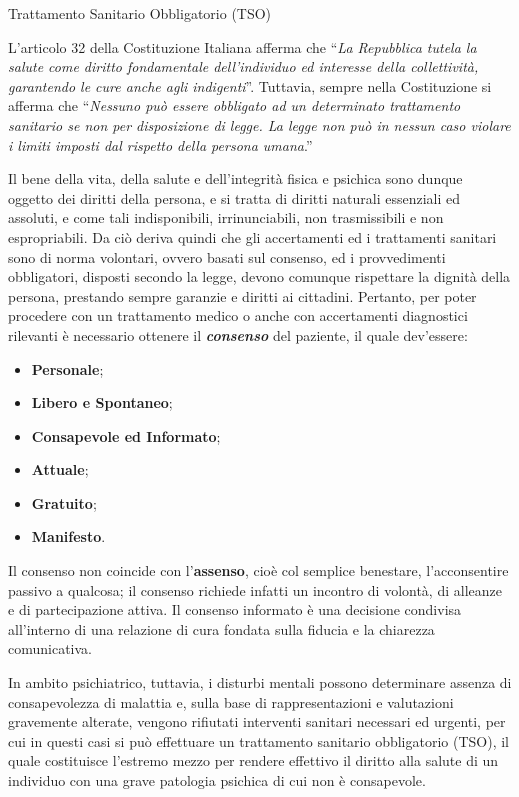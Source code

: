 \documentclass[]{article}
\date{}
\begin{document}
Trattamento Sanitario Obbligatorio (TSO)

L'articolo 32 della Costituzione Italiana afferma che ``\emph{La
Repubblica tutela la salute come diritto fondamentale dell'individuo ed
interesse della collettività, garantendo le cure anche agli
indigenti}''. Tuttavia, sempre nella Costituzione si afferma che
``\emph{Nessuno può essere obbligato ad un determinato trattamento
sanitario se non per disposizione di legge. La legge non può in nessun
caso violare i limiti imposti dal rispetto della persona umana}.''

Il bene della vita, della salute e dell'integrità fisica e psichica sono
dunque oggetto dei diritti della persona, e si tratta di diritti
naturali essenziali ed assoluti, e come tali indisponibili,
irrinunciabili, non trasmissibili e non espropriabili. Da ciò deriva
quindi che gli accertamenti ed i trattamenti sanitari sono di norma
volontari, ovvero basati sul consenso, ed i provvedimenti obbligatori,
disposti secondo la legge, devono comunque rispettare la dignità della
persona, prestando sempre garanzie e diritti ai cittadini. Pertanto, per
poter procedere con un trattamento medico o anche con accertamenti
diagnostici rilevanti è necessario ottenere il \textbf{\emph{consenso}}
del paziente, il quale dev'essere:

\begin{itemize}
\item
  \textbf{Personale};
\item
  \textbf{Libero e Spontaneo};
\item
  \textbf{Consapevole ed Informato};
\item
  \textbf{Attuale};
\item
  \textbf{Gratuito};
\item
  \textbf{Manifesto}.
\end{itemize}

Il consenso non coincide con l'\textbf{assenso}, cioè col semplice
benestare, l'acconsentire passivo a qualcosa; il consenso richiede
infatti un incontro di volontà, di alleanze e di partecipazione attiva.
Il consenso informato è una decisione condivisa all'interno di una
relazione di cura fondata sulla fiducia e la chiarezza comunicativa.

In ambito psichiatrico, tuttavia, i disturbi mentali possono determinare
assenza di consapevolezza di malattia e, sulla base di rappresentazioni
e valutazioni gravemente alterate, vengono rifiutati interventi sanitari
necessari ed urgenti, per cui in questi casi si può effettuare un
trattamento sanitario obbligatorio (TSO), il quale costituisce l'estremo
mezzo per rendere effettivo il diritto alla salute di un individuo con
una grave patologia psichica di cui non è consapevole.
\end{document}
